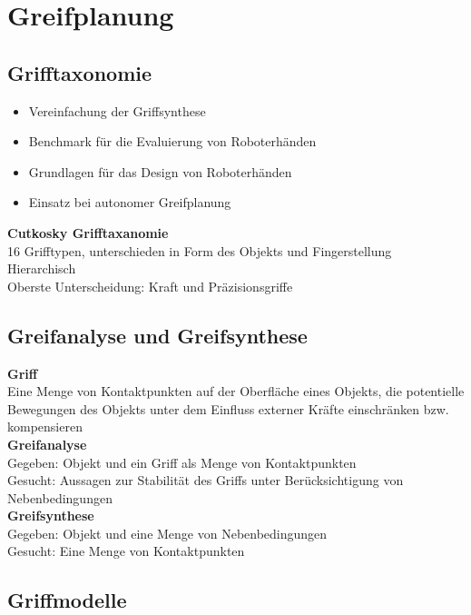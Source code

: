 

\section{Greifplanung}

\subsection{Grifftaxonomie}
\begin{itemize}
\item Vereinfachung der Griffsynthese
\item Benchmark für die Evaluierung von Roboterhänden
\item Grundlagen für das Design von Roboterhänden
\item Einsatz bei autonomer Greifplanung
\end{itemize}

\textbf{Cutkosky Grifftaxanomie}\\
16 Grifftypen, unterschieden in Form des Objekts und Fingerstellung\\
Hierarchisch\\
Oberste Unterscheidung: Kraft und Präzisionsgriffe

\subsection{Greifanalyse und Greifsynthese}
\textbf{Griff}\\
Eine Menge von Kontaktpunkten auf der Oberfläche eines Objekts, die potentielle Bewegungen des Objekts unter dem
Einfluss externer Kräfte einschränken bzw. kompensieren\\

\textbf{Greifanalyse}\\
Gegeben: Objekt und ein Griff als Menge von Kontaktpunkten\\
Gesucht: Aussagen zur Stabilität des Griffs unter Berücksichtigung von Nebenbedingungen\\

\textbf{Greifsynthese}\\
Gegeben: Objekt und eine Menge von Nebenbedingungen\\
Gesucht: Eine Menge von Kontaktpunkten

\subsection{Griffmodelle}
